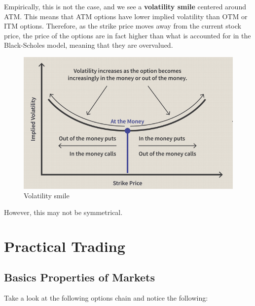 \documentclass{article}
\begin{document}
    \begin{definition}
      Empirically, this is not the case, and we see a \textbf{volatility smile} centered around ATM. This means that ATM options have lower implied volatility than OTM or ITM options. Therefore, as the strike price moves away from the current stock price, the price of the options are in fact higher than what is accounted for in the Black-Scholes model, meaning that they are overvalued.  
      \begin{figure}[H]
        \centering 
        \includegraphics[scale=0.4]{img/vol_smile.png}
        \caption{Volatility smile} 
        \label{fig:vol_smile}
      \end{figure}
    \end{definition}

    However, this may not be symmetrical. 

    \begin{definition}
      
    \end{definition}

\section{Practical Trading}

  \subsection{Basics Properties of Markets} 

    Take a look at the following options chain and notice the following: 
\end{document}
